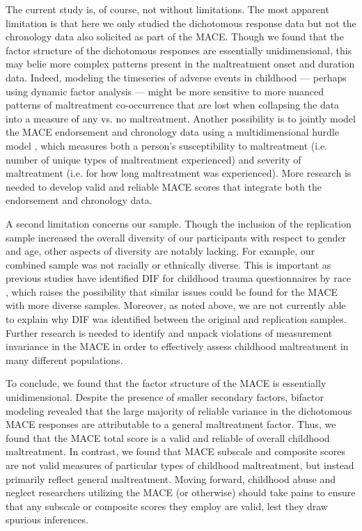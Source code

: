 \documentclass[letterpaper,man,natbib,floatsintext,longtable]{apa6}
\begin{document}
The current study is, of course, not without limitations. The most apparent limitation is that here we only studied the dichotomous response data but not the chronology data also solicited as part of the MACE. Though we found that the factor structure of the dichotomous responses are essentially unidimensional, this may belie more complex patterns present in the maltreatment onset and duration data. Indeed, modeling the timeseries of adverse events in childhood --- perhaps using dynamic factor analysis \citep{zhang2007bayesian} --- might be more sensitive to more nuanced patterns of maltreatment co-occurrence that are lost when collapsing the data into a measure of any vs. no maltreatment. Another possibility is to jointly model the MACE endorsement and chronology data using a multidimensional hurdle model \citep{magnus2021symptom}, which measures both a person's susceptibility to maltreatment (i.e. number of unique types of maltreatment experienced) and severity of maltreatment (i.e. for how long maltreatment was experienced). More research is needed to develop valid and reliable MACE scores that integrate both the endorsement and chronology data. 

A second limitation concerns our sample. Though the inclusion of the replication sample increased the overall diversity of our participants with respect to gender and age, other aspects of diversity are notably lacking. For example, our combined sample was not racially or ethnically diverse. This is important as previous studies have identified DIF for childhood trauma questionnaires by race \citep{thombs2007evaluation, rodriguez2019identification}, which raises the possibility that similar issues could be found for the MACE with more diverse samples. Moreover, as noted above, we are not currently able to explain why DIF was identified between the original and replication samples. Further research is needed to identify and unpack violations of measurement invariance in the MACE in order to effectively assess childhood maltreatment in many different populations. 

To conclude, we found that the factor structure of the MACE is essentially unidimensional. Despite the presence of smaller secondary factors, bifactor modeling revealed that the large majority of reliable variance in the dichotomous MACE responses are attributable to a general maltreatment factor. Thus, we found that the MACE total score is a valid and reliable of overall childhood maltreatment. In contrast, we found that MACE subscale and composite scores are not valid measures of particular types of childhood maltreatment, but instead primarily reflect general maltreatment. Moving forward, childhood abuse and neglect researchers utilizing the MACE (or otherwise) should take pains to ensure that any subscale or composite scores they employ are valid, lest they draw spurious inferences. 

\end{document}
